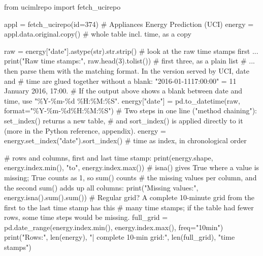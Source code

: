\documentclass[
  letterpaper,
  DIV=11,
  numbers=noendperiod]{scrreprt}
\newenvironment{Shaded}{\begin{snugshade}}{\end{snugshade}}
\newcommand{\BuiltInTok}[1]{\textcolor[rgb]{0.00,0.23,0.31}{#1}}
\newcommand{\CommentTok}[1]{\textcolor[rgb]{0.37,0.37,0.37}{#1}}
\newcommand{\DecValTok}[1]{\textcolor[rgb]{0.68,0.00,0.00}{#1}}
\newcommand{\ImportTok}[1]{\textcolor[rgb]{0.00,0.46,0.62}{#1}}
\newcommand{\NormalTok}[1]{\textcolor[rgb]{0.00,0.23,0.31}{#1}}
\newcommand{\OperatorTok}[1]{\textcolor[rgb]{0.37,0.37,0.37}{#1}}
\newcommand{\SpecialCharTok}[1]{\textcolor[rgb]{0.37,0.37,0.37}{#1}}
\newcommand{\StringTok}[1]{\textcolor[rgb]{0.13,0.47,0.30}{#1}}
\begin{document}
\begin{Shaded}
\begin{Highlighting}[]
\ImportTok{from}\NormalTok{ ucimlrepo }\ImportTok{import}\NormalTok{ fetch\_ucirepo}

\NormalTok{appl }\OperatorTok{=}\NormalTok{ fetch\_ucirepo(}\BuiltInTok{id}\OperatorTok{=}\DecValTok{374}\NormalTok{)                       }\CommentTok{\# Appliances Energy Prediction (UCI)}
\NormalTok{energy }\OperatorTok{=}\NormalTok{ appl.data.original.copy()                 }\CommentTok{\# whole table incl. time, as a copy}

\NormalTok{raw }\OperatorTok{=}\NormalTok{ energy[}\StringTok{"date"}\NormalTok{].astype(}\BuiltInTok{str}\NormalTok{).}\BuiltInTok{str}\NormalTok{.strip()       }\CommentTok{\# look at the raw time stamps first ...}
\BuiltInTok{print}\NormalTok{(}\StringTok{"Raw time stamps:"}\NormalTok{, raw.head(}\DecValTok{3}\NormalTok{).tolist())    }\CommentTok{\# first three, as a plain list}
\CommentTok{\# ... then parse them with the matching format. In the version served by UCI, date and}
\CommentTok{\# time are glued together without a blank: "2016{-}01{-}1117:00:00" = 11 January 2016, 17:00.}
\CommentTok{\# If the output above shows a blank between date and time, use "\%Y{-}\%m{-}\%d \%H:\%M:\%S".}
\NormalTok{energy[}\StringTok{"date"}\NormalTok{] }\OperatorTok{=}\NormalTok{ pd.to\_datetime(raw, }\BuiltInTok{format}\OperatorTok{=}\StringTok{"\%Y{-}\%m{-}}\SpecialCharTok{\%d}\StringTok{\%H:\%M:\%S"}\NormalTok{)}
\CommentTok{\# Two steps in one line ("method chaining"): set\_index() returns a new table,}
\CommentTok{\# and sort\_index() is applied directly to it (more in the Python reference, appendix).}
\NormalTok{energy }\OperatorTok{=}\NormalTok{ energy.set\_index(}\StringTok{"date"}\NormalTok{).sort\_index()     }\CommentTok{\# time as index, in chronological order}

\CommentTok{\# rows and columns, first and last time stamp:}
\BuiltInTok{print}\NormalTok{(energy.shape, energy.index.}\BuiltInTok{min}\NormalTok{(), }\StringTok{"to"}\NormalTok{, energy.index.}\BuiltInTok{max}\NormalTok{())}
\CommentTok{\# isna() gives True where a value is missing; True counts as 1, so sum() counts}
\CommentTok{\# the missing values per column, and the second sum() adds up all columns:}
\BuiltInTok{print}\NormalTok{(}\StringTok{"Missing values:"}\NormalTok{, energy.isna().}\BuiltInTok{sum}\NormalTok{().}\BuiltInTok{sum}\NormalTok{())}
\CommentTok{\# Regular grid? A complete 10{-}minute grid from the first to the last time stamp has this}
\CommentTok{\# many time stamps; if the table had fewer rows, some time steps would be missing.}
\NormalTok{full\_grid }\OperatorTok{=}\NormalTok{ pd.date\_range(energy.index.}\BuiltInTok{min}\NormalTok{(), energy.index.}\BuiltInTok{max}\NormalTok{(), freq}\OperatorTok{=}\StringTok{"10min"}\NormalTok{)}
\BuiltInTok{print}\NormalTok{(}\StringTok{"Rows:"}\NormalTok{, }\BuiltInTok{len}\NormalTok{(energy), }\StringTok{"| complete 10{-}min grid:"}\NormalTok{, }\BuiltInTok{len}\NormalTok{(full\_grid), }\StringTok{"time stamps"}\NormalTok{)}
\end{Highlighting}
\end{Shaded}
\end{document}
